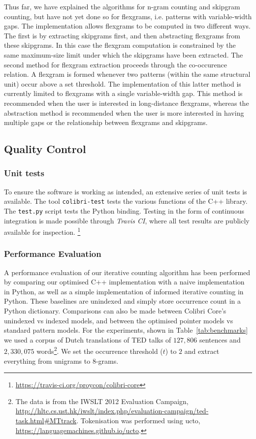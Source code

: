 \documentclass[a4paper,12pt]{article}
\begin{document}
Thus far, we have explained the algorithms for n-gram counting and skipgram
counting, but have not yet done so for flexgrams, i.e. patterns with
variable-width gaps. The implementation allows flexgrams to be computed in two
different ways. The first is by extracting skipgrams first, and then
abstracting flexgrams from these skipgrams. In this case the flexgram
computation is constrained by the same maximum-size limit under which the
skipgrams have been extracted.  The second method for flexgram extraction
proceeds through the co-occurence relation. A flexgram is formed whenever two
patterns (within the same structural unit) occur above a set threshold. The
implementation of this latter method is currently limited to flexgrams with a
single variable-width gap. This method is recommended when the user is
interested in long-distance flexgrams, whereas the abstraction method is
recommended when the user is more interested in having multiple gaps or
the relationship between flexgrams and skipgrams.

\subsection{Quality Control}
\label{sec:qc}


\subsubsection{Unit tests}

To ensure the software is working as intended, an extensive series of unit
tests is available.  The tool \texttt{colibri-test} tests the various functions
of the C++ library. The \texttt{test.py} script tests the Python binding.
Testing in the form of continuous integration is made possible through
\emph{Travis CI}, where all test results are publicly available for inspection.
\footnote{\url{https://travis-ci.org/proycon/colibri-core}}

\subsubsection{Performance Evaluation}

A performance evaluation of our iterative counting algorithm has been performed
by comparing our optimised C++ implementation with a naive implementation in
Python, as well as a simple implementation of informed iterative counting in
Python. These baselines are unindexed and simply store occurrence count in a
Python dictionary. Comparisons can also be made between Colibri Core's
unindexed vs indexed models, and between the optimised pointer models vs
standard pattern models.  For the experiments, shown in
Table~\ref{tab:benchmarks} we used a corpus of Dutch
translations of TED talks of $127,806$ sentences and $2,330,075$
words\footnote{The data is from the IWSLT 2012 Evaluation Campaign,
    \url{http://hltc.cs.ust.hk/iwslt/index.php/evaluation-campaign/ted-task.html\#MTtrack}.
Tokenisation was performed using ucto, \url{https://languagemachines.github.io/ucto}.}. We set
the occurrence threshold ($t$) to $2$ and extract everything from unigrams to
$8$-grams. 
\end{document}
